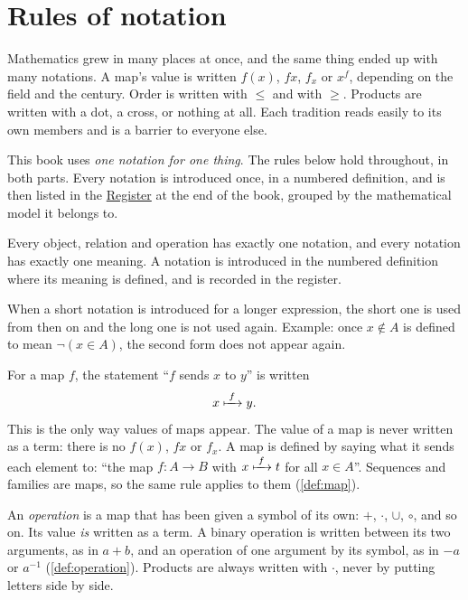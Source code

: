 \chapter*{Rules of notation}
\label{rules}

Mathematics grew in many places at once, and the same thing ended up with many
notations. A map's value is written $f(x)$, $fx$, $f_x$ or $x^f$, depending on the
field and the century. Order is written with $\le$ and with $\ge$. Products are
written with a dot, a cross, or nothing at all. Each tradition reads easily to
its own members and is a barrier to everyone else.

This book uses \emph{one notation for one thing}. The rules below hold
throughout, in both parts. Every notation is introduced once, in a numbered
definition, and is then listed in the \hyperref[register]{Register} at the end of
the book, grouped by the mathematical model it belongs to.

\begin{notationrule}
\label{rule:one}
Every object, relation and operation has exactly one notation, and every
notation has exactly one meaning. A notation is introduced in the numbered
definition where its meaning is defined, and is recorded in the register.
\end{notationrule}

\begin{notationrule}
\label{rule:abbreviation}
When a short notation is introduced for a longer expression, the short one is
used from then on and the long one is not used again. Example: once $x \notin A$
is defined to mean $\lnot (x \in A)$, the second form does not appear again.
\end{notationrule}

\begin{notationrule}[Maps]
\label{rule:maps}
For a map $f$, the statement \enquote{$f$ sends $x$ to $y$} is written
\[
  x \xmapsto{\;f\;} y.
\]
This is the only way values of maps appear. The value of a map is never written
as a term: there is no $f(x)$, $fx$ or $f_x$. A map is defined by saying what it
sends each element to: \enquote{the map $f \colon A \to B$ with $x \xmapsto{\;f\;} t$ for
all $x \in A$}. Sequences and families are maps, so the same rule applies to them
(\cref{def:map}).
\end{notationrule}

\begin{notationrule}[Operations]
\label{rule:operations}
An \emph{operation} is a map that has been given a symbol of its own: $+$,
$\cdot$, $\cup$, $\circ$, and so on. Its value \emph{is} written as a term. A
binary operation is written between its two arguments, as in $a + b$, and an
operation of one argument by its symbol, as in $-a$ or $a^{-1}$
(\cref{def:operation}). Products are always written with $\cdot$, never by
putting letters side by side.
\end{notationrule}

